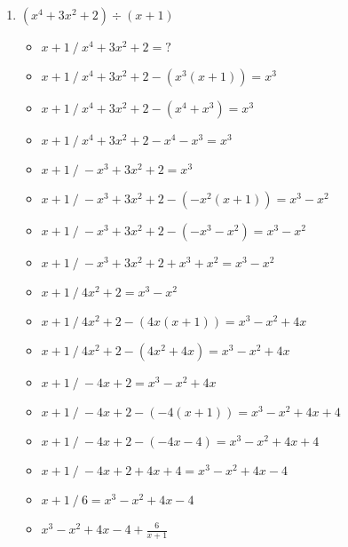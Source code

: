 \documentclass{article}
\begin{document}
\begin{onehalfspace}
\begin{enumerate}
    \item $(x^{4} + 3x^{2} + 2) \div (x + 1)$
    \begin{itemize}
        \item $x + 1 \ / \ x^{4} + 3x^{2} + 2 = ?$
        \item $x + 1 \ / \ x^{4} + 3x^{2} + 2 - (x^{3}(x + 1)) = x^{3}$
        \item $x + 1 \ / \ x^{4} + 3x^{2} + 2 - (x^{4} + x^{3}) = x^{3}$
        \item $x + 1 \ / \ x^{4} + 3x^{2} + 2 - x^{4} - x^{3} = x^{3}$
        \item $x + 1 \ / \ -x^{3} + 3x^{2} + 2 = x^{3}$
        \item $x + 1 \ / \ -x^{3} + 3x^{2} + 2 - (-x^{2}(x + 1)) = x^{3} - x^{2}$
        \item $x + 1 \ / \ -x^{3} + 3x^{2} + 2 - (-x^{3} - x^{2}) = x^{3} - x^{2}$
        \item $x + 1 \ / \ -x^{3} + 3x^{2} + 2 + x^{3} + x^{2} = x^{3} - x^{2}$
        \item $x + 1 \ / \ 4x^{2} + 2 = x^{3} - x^{2}$
        \item $x + 1 \ / \ 4x^{2} + 2 - (4x(x + 1)) = x^{3} - x^{2} + 4x$
        \item $x + 1 \ / \ 4x^{2} + 2 - (4x^{2} + 4x) = x^{3} - x^{2} + 4x$
        \item $x + 1 \ / \ - 4x + 2 = x^{3} - x^{2} + 4x$
        \item $x + 1 \ / \ - 4x + 2 - (-4(x + 1)) = x^{3} - x^{2} + 4x + 4$
        \item $x + 1 \ / \ - 4x + 2 - (-4x - 4) = x^{3} - x^{2} + 4x + 4$
        \item $x + 1 \ / \ - 4x + 2 + 4x + 4 = x^{3} - x^{2} + 4x - 4$
        \item $x + 1 \ / \ 6 = x^{3} - x^{2} + 4x - 4$
        \item $x^{3} - x^{2} + 4x - 4 + \frac{6}{x + 1}$
    \end{itemize}


\end{enumerate}
\end{onehalfspace}
\end{document}
